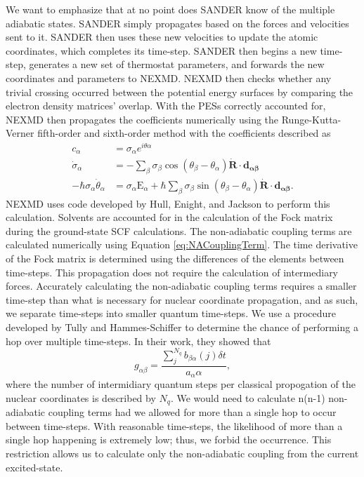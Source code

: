 We want to emphasize that at no point does SANDER know of the
multiple adiabatic states. SANDER simply propagates based on the forces and
velocities sent to it. SANDER then uses these new velocities to update
the atomic coordinates, which completes its time-step. SANDER then
begins a new time-step, generates a new set of thermostat parameters,
and forwards the new coordinates and parameters to NEXMD. NEXMD then
checks whether any trivial crossing occurred between the potential
energy surfaces by comparing the electron density matrices’ overlap.
\cite{nelson2012nonadiabatic} With the PESs correctly accounted for,
NEXMD then propagates the coefficients numerically using the
Runge-Kutta-Verner fifth-order and sixth-order method with the
coefficients described as
\begin{align}
  c_\alpha &= \sigma_\alpha e^{i\theta \alpha}\\
  \dot{\sigma}_\alpha &= - \sum_{\beta} \sigma_{\beta} \cos(\theta_{\beta} - \theta_{\alpha}) \dot{\mathbf{R}} \cdot \mathbf{d_{\alpha\beta}}\\
  -\hbar \sigma_\alpha \dot{\theta}_\alpha &= \sigma_\alpha \text{E}_\alpha + \hbar \sum_\beta \sigma_\beta \sin(\theta_{\beta} - \theta_\alpha)\dot{\mathbf{R}} \cdot \mathbf{d_{\alpha\beta}}.
\end{align}
NEXMD uses code developed by Hull, Enight, and Jackson to perform this calculation.\cite{hull1996runge}
Solvents are accounted for in the calculation of the Fock matrix during the ground-state SCF calculations. The non-adiabatic coupling terms are calculated numerically using Equation \ref{eq:NACouplingTerm}. The time derivative of the Fock matrix is determined using the differences of the elements between time-steps. This propagation does not require the calculation of intermediary forces.
Accurately calculating the non-adiabatic coupling terms requires a smaller time-step than what is necessary for nuclear coordinate propagation, and as such, we separate time-steps into smaller quantum time-steps. We use a procedure developed by Tully and Hammes-Schiffer to determine the chance of performing a hop over multiple time-steps.\cite{hammes1994proton}
In their work, they showed that
\begin{equation}
  g_{\alpha\beta} = \frac{\sum_j^{N_q} b_{\beta\alpha}(j) \delta t}{a_\alpha\alpha},
\end{equation}
where the number of intermidiary quantum steps per classical
propogation of the nuclear coordinates is described by \(N_q\). We
would need to calculate n(n-1) non-adiabatic coupling terms had we
allowed for more than a single hop to occur between time-steps. With
reasonable time-steps, the likelihood of more than a single hop
happening is extremely low; thus, we forbid the occurrence. This
restriction allows us to calculate only the non-adiabatic coupling from
the current excited-state.

